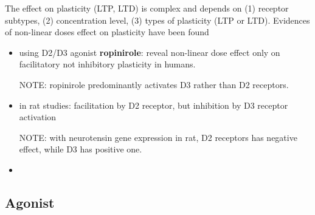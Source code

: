 The effect on plasticity (LTP, LTD) is complex and depends on (1) receptor
subtypes, (2) concentration level, (3) types of plasticity (LTP or LTD).
Evidences of non-linear doses effect on plasticity have been found 
\begin{itemize}
  \item  using D2/D3 agonist {\bf ropinirole}: reveal non-linear dose effect
  only on facilitatory not inhibitory plasticity in humans.
  
  NOTE: ropinirole predominantly activates D3 rather than D2 receptors.
  
  \item in rat studies: facilitation by D2 receptor, but inhibition by D3
  receptor activation 
  
  NOTE: with neurotensin gene expression in rat, D2 receptors has negative
  effect, while D3 has positive one.
  
  \item 
\end{itemize}

\subsection{Agonist}
\label{sec:D2-receptor-agonist}
\label{sec:D1-receptor-agonist}

